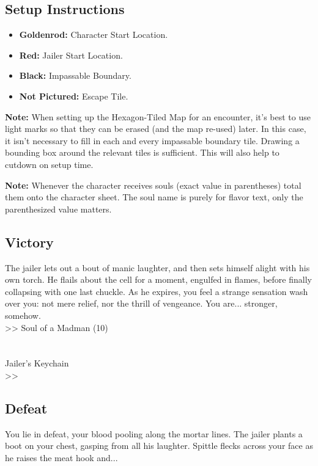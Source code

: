 \subsection*{Setup Instructions}
\begin{itemize}
\item \textbf{Goldenrod:} Character Start Location.
\item \textbf{Red:} Jailer Start Location.
\item \textbf{Black:} Impassable Boundary.
\item \textbf{Not Pictured:} Escape Tile.
\end{itemize}

\begin{tcolorbox}
\textbf{Note:} When setting up the Hexagon-Tiled Map for an encounter, it’s best to use light marks so that they can be erased (and the map re-used) later. In this case, it isn’t necessary to fill in each and every impassable boundary tile. Drawing a bounding box around the relevant tiles is sufficient. This will also help to cutdown on setup time.
\end{tcolorbox}

\pagebreak

\begin{tcolorbox}
\textbf{Note:} Whenever the character receives souls (exact value in parentheses) total them onto the character sheet. The soul name is purely for flavor text, only the parenthesized value matters.
\end{tcolorbox}

\subsection*{Victory}
The jailer lets out a bout of manic laughter, and then sets himself alight with his own torch. He flails about the cell for a moment, engulfed in flames, before finally collapsing with one last chuckle. As he expires, you feel a strange sensation wash over you: not mere relief, nor the thrill of vengeance. You are... stronger, somehow.\\
>> Soul of a Madman (10)\\
\\
\\
 Jailer’s Keychain\\
>> 

\subsection*{Defeat}
You lie in defeat, your blood pooling along the mortar lines. The jailer plants a boot on your chest, gasping from all his laughter. Spittle flecks across your face as he raises the meat hook and...\\

